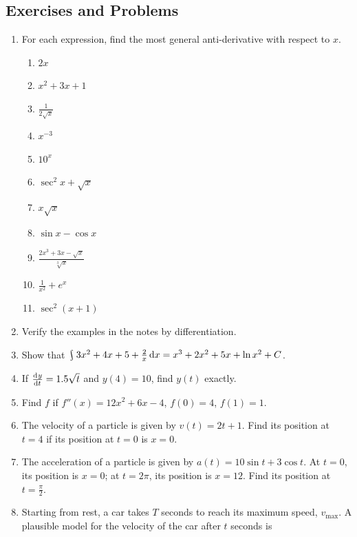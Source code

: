 \subsection{Exercises and Problems}
\begin{enumerate}
  \item For each expression, find the most general anti-derivative with respect to $ x $.
    \begin{multicols}{2}
    \begin{enumerate}
      \item $ 2x $
      \item $ x^2 + 3x + 1 $
      \item $ \frac{1}{2\sqrt{x}} $
      \item $ x^{-3} $
      \item $ 10^x $
      \item $ \sec^2 x + \sqrt{x} $
      \item $ x\sqrt{x} $
      \item $ \sin x - \cos x $
      \item $ \frac{2x^3 + 3x - \sqrt{x}}{\sqrt[3]{x}} $
      \item $ \frac{1}{x^2} + e^x $
      \item $ \sec^2 (x + 1) $
    \end{enumerate}
    \end{multicols}
  \item Verify the examples in the notes by differentiation.
  \item Show that $ \rint 3x^2 + 4x + 5 + \frac{2}{x} \dif{x} = x^3 + 2x^2 + 5x + \ln x^2 + C $.
  \item If $ \od{y}{t} = 1.5 \sqrt{t} $ and $ y(4) = 10 $, find $ y(t) $ exactly.
  \item Find $ f $ if $ f''(x) = 12x^2 + 6x - 4 $, $ f(0) = 4 $, $ f(1) = 1 $.
  \item The velocity of a particle is given by $ v(t) = 2t + 1 $. Find its position at $ t = 4 $
        if its position at $ t = 0 $ is $ x = 0 $.
  \item The acceleration of a particle is given by $ a(t) = 10\sin t + 3\cos t $. At $ t = 0 $, its position is $ x = 0 $; at $ t = 2\pi $,
        its position is $ x = 12 $. Find its position at $ t = \frac{\pi}{2} $.
  \item Starting from rest, a car takes $ T $ seconds to reach its maximum speed, $ v_\text{max} $. A plausible
        model for the velocity of the car after $ t $ seconds is
        \begin{displaymath}

\end{displaymath}
\end{enumerate}
